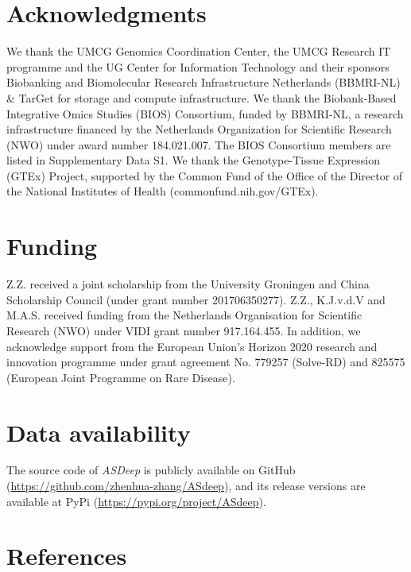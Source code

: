 \documentclass{book}
\begin{document}
\begin{refsection}
\section*{Acknowledgments}
We thank the UMCG Genomics Coordination Center, the UMCG Research IT programme and the UG Center for Information Technology and their sponsors Biobanking and Biomolecular Research Infrastructure Netherlands (BBMRI-NL) \& TarGet for storage and compute infrastructure.
We thank the Biobank-Based Integrative Omics Studies (BIOS) Consortium, funded by BBMRI-NL, a research infrastructure financed by the Netherlands Organization for Scientific Research (NWO) under award number 184.021.007.
The BIOS Consortium members are listed in Supplementary Data S1.
We thank the Genotype-Tissue Expression (GTEx) Project, supported by the Common Fund of the Office of the Director of the National Institutes of Health (commonfund.nih.gov/GTEx).

\section*{Funding}
Z.Z. received a joint scholarship from the University Groningen and China Scholarship Council (under grant number 201706350277).
Z.Z., K.J.v.d.V and M.A.S. received funding from the Netherlands Organisation for Scientific Research (NWO) under VIDI grant number 917.164.455.
In addition, we acknowledge support from the European Union's Horizon 2020 research and innovation programme under grant agreement No. 779257 (Solve-RD) and 825575 (European Joint Programme on Rare Disease).

\section*{Data availability}
The source code of \textit{ASDeep} is publicly available on GitHub (\url{https://github.com/zhenhua-zhang/ASdeep}), and its release versions are available at PyPi (\url{https://pypi.org/project/ASdeep}).


\section*{References}
\printbibliography[heading=none]

\clearpage

\end{refsection}
\end{document}
